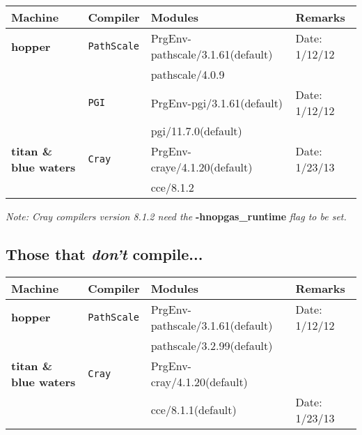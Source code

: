 \begin{table*}[!h]
\begin{tabular}{|l|l|l|l|} \hline
Machine & Compiler & Modules & Remarks \\
\hline
{\bf hopper} & {\tt PathScale} & PrgEnv-pathscale/3.1.61(default) & Date: 1/12/12\\
& & pathscale/4.0.9 & \\
\cline{2-4}
& {\tt PGI} & PrgEnv-pgi/3.1.61(default) & Date: 1/12/12\\
& & pgi/11.7.0(default) & \\
\hline
{\bf titan \& blue waters} & {\tt Cray} & PrgEnv-craye/4.1.20(default) & Date: 1/23/13\\
& & cce/8.1.2 & \\
\hline
\end{tabular}
\label{Table:Those-that-compile}
\end{table*}
{\em Note: Cray compilers version 8.1.2 need the } {\bf -hnopgas\_runtime} {\em flag to be set.}

\subsection{Those that {\em don't} compile...}
\begin{table*}[!h]
\begin{tabular}{|l|l|l|l|} \hline
Machine & Compiler & Modules & Remarks \\
\hline
{\bf hopper} & {\tt PathScale} & PrgEnv-pathscale/3.1.61(default) & Date: 1/12/12\\
& & pathscale/3.2.99(default) & \\
\hline
{\bf titan \& blue waters} & {\tt Cray} & PrgEnv-cray/4.1.20(default) & \\
& & cce/8.1.1(default) & Date: 1/23/13\\
\hline
\end{tabular}
\label{Table:Those-that-dont-compile}
\end{table*}
